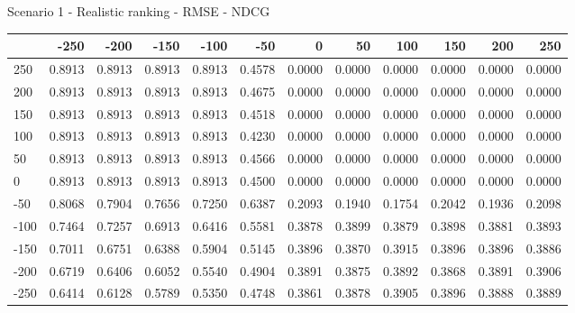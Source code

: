 Scenario 1 - Realistic ranking - RMSE - NDCG
\begin{tabular}{lrrrrrrrrrrr}
\toprule
{} &   -250 &   -200 &   -150 &   -100 &   -50  &    0   &    50  &    100 &    150 &    200 &    250 \\
\midrule
 250 & 0.8913 & 0.8913 & 0.8913 & 0.8913 & 0.4578 & 0.0000 & 0.0000 & 0.0000 & 0.0000 & 0.0000 & 0.0000 \\
 200 & 0.8913 & 0.8913 & 0.8913 & 0.8913 & 0.4675 & 0.0000 & 0.0000 & 0.0000 & 0.0000 & 0.0000 & 0.0000 \\
 150 & 0.8913 & 0.8913 & 0.8913 & 0.8913 & 0.4518 & 0.0000 & 0.0000 & 0.0000 & 0.0000 & 0.0000 & 0.0000 \\
 100 & 0.8913 & 0.8913 & 0.8913 & 0.8913 & 0.4230 & 0.0000 & 0.0000 & 0.0000 & 0.0000 & 0.0000 & 0.0000 \\
 50  & 0.8913 & 0.8913 & 0.8913 & 0.8913 & 0.4566 & 0.0000 & 0.0000 & 0.0000 & 0.0000 & 0.0000 & 0.0000 \\
 0   & 0.8913 & 0.8913 & 0.8913 & 0.8913 & 0.4500 & 0.0000 & 0.0000 & 0.0000 & 0.0000 & 0.0000 & 0.0000 \\
-50  & 0.8068 & 0.7904 & 0.7656 & 0.7250 & 0.6387 & 0.2093 & 0.1940 & 0.1754 & 0.2042 & 0.1936 & 0.2098 \\
-100 & 0.7464 & 0.7257 & 0.6913 & 0.6416 & 0.5581 & 0.3878 & 0.3899 & 0.3879 & 0.3898 & 0.3881 & 0.3893 \\
-150 & 0.7011 & 0.6751 & 0.6388 & 0.5904 & 0.5145 & 0.3896 & 0.3870 & 0.3915 & 0.3896 & 0.3896 & 0.3886 \\
-200 & 0.6719 & 0.6406 & 0.6052 & 0.5540 & 0.4904 & 0.3891 & 0.3875 & 0.3892 & 0.3868 & 0.3891 & 0.3906 \\
-250 & 0.6414 & 0.6128 & 0.5789 & 0.5350 & 0.4748 & 0.3861 & 0.3878 & 0.3905 & 0.3896 & 0.3888 & 0.3889 \\
\bottomrule
\end{tabular}

